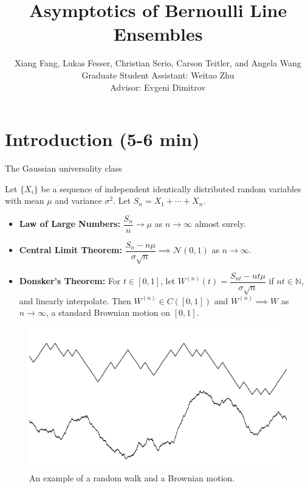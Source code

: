 \documentclass[9pt,t,dvipsnames]{beamer}
\title{Asymptotics of Bernoulli Line Ensembles}
\author[Fang, Fesser, Serio, Teitler, and Wang]{Xiang Fang, Lukas Fesser, Christian Serio, Carson Teitler, and Angela Wang \\
Graduate Student Assistant: Weitao Zhu\\
Advisor: Evgeni Dimitrov}
\institute[Columbia]{Columbia University REU}
\begin{document}
	
	\begin{frame}
		\maketitle
	\end{frame}


\section{Introduction (5-6 min)}

\begin{frame}{The Gaussian universality class}

Let $\{X_i\}$ be a sequence of independent identically distributed random variables with mean $\mu$ and variance $\sigma^2$. Let $S_n = X_1 + \cdots + X_n$.

\bigskip

\begin{itemize}
\item \textbf{Law of Large Numbers:} $\dfrac{S_n}{n} \longrightarrow \mu$ as $n \rightarrow \infty$ almost surely.

\bigskip

\item \textbf{Central Limit Theorem:} $\dfrac{S_n - n\mu}{\sigma\sqrt{n}} \implies \mathcal{N}(0, 1)$ as $n \rightarrow \infty$.

\bigskip

\item \textbf{Donsker's Theorem:} For $t\in[0,1]$, let $W^{(n)}(t) = \dfrac{S_{nt}-nt\mu}{\sigma\sqrt{n}}$ if $nt\in\mathbb{N}$, and linearly interpolate. Then $W^{(n)} \in C([0, 1])$ and $W^{(n)} \implies W$ as $n\to\infty$, a standard Brownian motion on $[0,1]$.
\end{itemize}
\begin{figure}
\includegraphics[height=0.25\textheight]{graphics/Gaussian.png}
\caption{An example of a random walk and a Brownian motion.}
\end{figure}

\end{frame}
\end{document}
